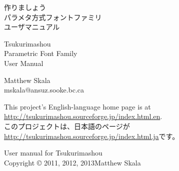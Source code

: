 \documentclass[14pt]{extarticle}
\begin{document}
\pagestyle{plain}\thispagestyle{empty}


\kaku
\begin{center}\LARGE

\vspace*{\fill}


{\Huge 作りましょう~\TsukurimashouVWide}\\
{\huge パラメタ方式フォントファミリ\\
ユーザマニュアル}

\vspace*{0.75in}

{\Huge Tsukurimashou~\TsukurimashouVersion}\\
{\huge Parametric Font Family\\
User Manual}

\vspace*{1.5in}

Matthew Skala\\
mskala@ansuz.sooke.bc.ca\\
\TsukurimashouRDWide\qquad\TsukurimashouReleaseDate

\vspace*{\fill}

\end{center}
\clearpage


\vspace*{\fill}


This project's English-language home page is at\\
\hspace*{1em}\url{http://tsukurimashou.sourceforge.jp/index.html.en}.\\
このプロジェクトは、日本語のページが\\
\hspace*{1em}\url{http://tsukurimashou.sourceforge.jp/index.html.ja}です。

\vspace*{1in}

User manual for Tsukurimashou\\
Copyright © 2011, 2012, 2013\quad Matthew Skala
\end{document}
